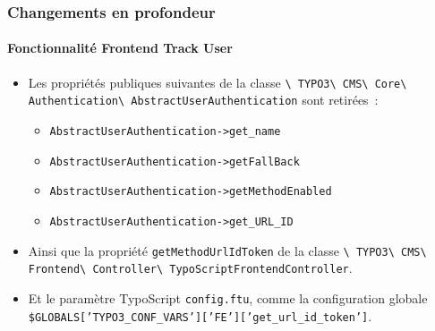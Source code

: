 
\begin{frame}[fragile]
	\frametitle{Changements en profondeur}
	\framesubtitle{Fonctionnalité Frontend Track User}

	\begin{itemize}

		\item Les propriétés publiques suivantes de la classe\newline
			\smaller\texttt{\textbackslash
				TYPO3\textbackslash
				CMS\textbackslash
				Core\textbackslash
				Authentication\textbackslash
				AbstractUserAuthentication}
			\normalsize\newline
			sont retirées~:

			\begin{itemize}\smaller
				\item \texttt{AbstractUserAuthentication->get\_name}
				\item \texttt{AbstractUserAuthentication->getFallBack}
				\item \texttt{AbstractUserAuthentication->getMethodEnabled}
				\item \texttt{AbstractUserAuthentication->get\_URL\_ID}
			\end{itemize}\normalsize

		\item Ainsi que la propriété \texttt{getMethodUrlIdToken} de la classe\newline
			\smaller\texttt{\textbackslash
				TYPO3\textbackslash
				CMS\textbackslash
				Frontend\textbackslash
				Controller\textbackslash
				TypoScriptFrontendController}.
			\normalsize

		\item Et le paramètre TypoScript \texttt{config.ftu},
			comme la configuration globale
			{\fontsize{8}{8}\selectfont\texttt{\$GLOBALS['TYPO3\_CONF\_VARS']['FE']['get\_url\_id\_token']}.}

	\end{itemize}

\end{frame}


